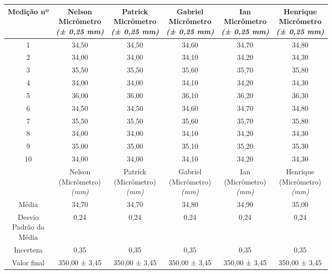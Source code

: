 \documentclass{article}
\begin{document}
\begin{table}[h!]
\centering
\begin{tabular}{c c c c c c }
\toprule
Medição nº & \shortstack{Nelson\\Micrômetro\\\textit{(± 0,25 mm)}} & \shortstack{Patrick\\Micrômetro\\\textit{(± 0,25 mm)}} & \shortstack{Gabriel\\Micrômetro\\\textit{(± 0,25 mm)}} & \shortstack{Ian\\Micrômetro\\\textit{(± 0,25 mm)}} & \shortstack{Henrique\\Micrômetro\\\textit{(± 0,25 mm)}}\\
\midrule
1 & 34,50 & 34,50 & 34,60 & 34,70 & 34,80\\
2 & 34,00 & 34,00 & 34,10 & 34,20 & 34,30\\
3 & 35,50 & 35,50 & 35,60 & 35,70 & 35,80\\
4 & 34,00 & 34,00 & 34,10 & 34,20 & 34,30\\
5 & 36,00 & 36,00 & 36,10 & 36,20 & 36,30\\
6 & 34,50 & 34,50 & 34,60 & 34,70 & 34,80\\
7 & 35,50 & 35,50 & 35,60 & 35,70 & 35,80\\
8 & 34,00 & 34,00 & 34,10 & 34,20 & 34,30\\
9 & 35,00 & 35,00 & 35,10 & 35,20 & 35,30\\
10 & 34,00 & 34,00 & 34,10 & 34,20 & 34,30\\
\midrule
&\shortstack{Nelson\\(Micrômetro)\\\textit{(mm)}} & \shortstack{Patrick\\(Micrômetro)\\\textit{(mm)}} & \shortstack{Gabriel\\(Micrômetro)\\\textit{(mm)}} & \shortstack{Ian\\(Micrômetro)\\\textit{(mm)}} & \shortstack{Henrique\\(Micrômetro)\\\textit{(mm)}}\\
\midrule
Média & 34,70 & 34,70 & 34,80 & 34,90 & 35,00\\[3pt]
\shortstack{Desvio\\Padrão da\\Média} & 0,24 & 0,24 & 0,24 & 0,24 & 0,24\\[3pt]
Incerteza & 0,35 & 0,35 & 0,35 & 0,35 & 0,35\\[3pt]
Valor final & 350,00 ± 3,45 & 350,00 ± 3,45 & 350,00 ± 3,45 & 350,00 ± 3,45 & 350,00 ± 3,45\\[3pt]
\bottomrule
\end{tabular}
\end{table}
\end{document}
